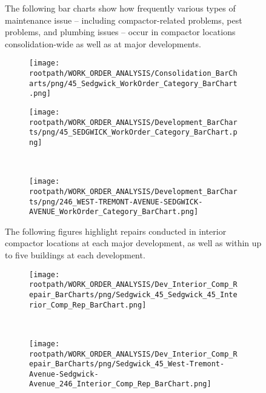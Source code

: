 \begin{figure}[h]
                                \sf
                                The following bar charts show how frequently various types of maintenance issue -- including compactor-related problems, pest problems, and plumbing issues -- occur in compactor locations consolidation-wide as well as at major developments.
                                \raggedright
                                \begin{subfigure}{\textwidth}
                                \texttt{[image: \\rootpath/WORK\_ORDER\_ANALYSIS/Consolidation\_BarCharts/png/45\_Sedgwick\_WorkOrder\_Category\_BarChart.png]}
                                \end{subfigure}
                                
                                        \begin{subfigure}{0.45\textwidth}
                                        \texttt{[image: \\rootpath/WORK\_ORDER\_ANALYSIS/Development\_BarCharts/png/45\_SEDGWICK\_WorkOrder\_Category\_BarChart.png]}
                                        \end{subfigure}
                                        ~
                                        \begin{subfigure}{0.45\textwidth}
                                        \texttt{[image: \\rootpath/WORK\_ORDER\_ANALYSIS/Development\_BarCharts/png/246\_WEST-TREMONT-AVENUE-SEDGWICK-AVENUE\_WorkOrder\_Category\_BarChart.png]}
                                        \end{subfigure}
                                        
                                        \end{figure}
\begin{figure}[h]
                                \raggedright
                                \sf
                                The following figures highlight repairs conducted in interior compactor locations at each major development, as well as within up to five buildings at each development.\\
                                \begin{subfigure}{0.45\textwidth}
                                        \texttt{[image: \\rootpath/WORK\_ORDER\_ANALYSIS/Dev\_Interior\_Comp\_Repair\_BarCharts/png/Sedgwick\_45\_Sedgwick\_45\_Interior\_Comp\_Rep\_BarChart.png]}
                                        \end{subfigure}
                                        ~
                                        \begin{subfigure}{0.45\textwidth}
                                        \texttt{[image: \\rootpath/WORK\_ORDER\_ANALYSIS/Dev\_Interior\_Comp\_Repair\_BarCharts/png/Sedgwick\_45\_West-Tremont-Avenue-Sedgwick-Avenue\_246\_Interior\_Comp\_Rep\_BarChart.png]}
                                        \end{subfigure}
                                        
                                        
\end{figure}
